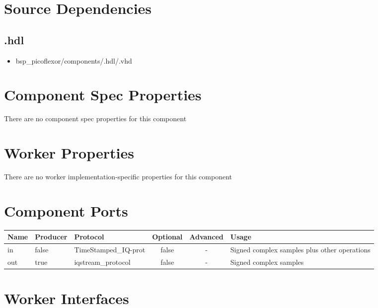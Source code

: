 \section*{Source Dependencies}
\subsection*{\comp.hdl}
\begin{itemize}
	\item bsp\_picoflexor/components/\comp.hdl/\comp.vhd
\end{itemize}

\begin{landscape}
	\section*{Component Spec Properties}
	There are no component spec properties for this component
	
	\section*{Worker Properties}
	There are no worker implementation-specific properties for this component
	
	\section*{Component Ports}
	\begin{scriptsize}
		\begin{tabular}{|M{2cm}|M{1.5cm}|M{4cm}|c|c|M{9cm}|}
			\hline
			Name & Producer & Protocol                       & Optional & Advanced & Usage                                  		\\
			\hline
			in   & false    & TimeStamped\_IQ-prot           & false    & -        & Signed complex samples plus other operations   \\
			\hline
			out  & true     & iqstream\_protocol			 & false    & -        & Signed complex samples 						\\
			\hline
		\end{tabular}
	\end{scriptsize}
	\section*{Worker Interfaces}

\end{landscape}
